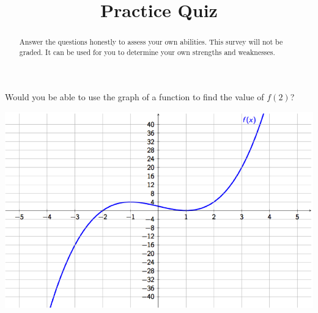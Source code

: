 \documentclass{ximera}
\title{Practice Quiz}
\begin{document}
\begin{abstract}
Answer the questions honestly to assess your own abilities. This survey will not be graded. It can be used for you to determine your own strengths and weaknesses.
\end{abstract}
\maketitle

\begin{problem} 
    Would you be able to use the graph of a function to find the value of $f(2)$?
    
    \begin{center} \includegraphics[scale = 0.7]{Graphing1.png} \end{center}
  \begin{multipleChoice}
  \end{multipleChoice}
\end{problem}
\end{document}
